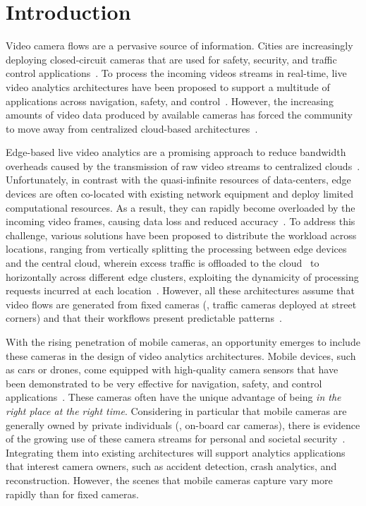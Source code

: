 \section{Introduction}\label{sec:intro}

Video camera flows are a pervasive source of information. Cities are increasingly deploying closed-circuit cameras that are used for safety,
security, and traffic control applications~\cite{parascandola_2018,ratcliffe_2020,grassi2017parkmaster}. To process the incoming videos streams in real-time, live video analytics architectures have been proposed to support a multitude of applications across navigation, safety, and control~\cite{ananthanarayanan2017real,ao2018sprocket,zeng2020distream,jiang2018chameleon,zhang2017live}. However, the increasing amounts of video data produced by available cameras has forced the community to move away from centralized cloud-based architectures~\cite{yi2017lavea,ananthanarayanan2017real}.

Edge-based live video analytics are a promising approach to reduce bandwidth overheads caused by the transmission of raw video streams to centralized clouds~\cite{hu2023edge}. Unfortunately, in contrast with the quasi-infinite resources of data-centers, edge devices are often co-located with existing network equipment and deploy limited computational resources. As a result, they can rapidly become overloaded by the incoming video frames, causing data loss and reduced accuracy~\cite{jiang2018chameleon,jain2020spatula}. To address this challenge, various solutions have been proposed to distribute the workload across locations, ranging from vertically splitting the processing between edge devices and the central cloud, wherein excess traffic is offloaded to the cloud~\cite{hung2018videoedge,chen2015glimpse} to horizontally across different edge clusters, exploiting the dynamicity of processing requests incurred at each location~\cite{jain2020spatula,zhang2019hetero}. However, all these architectures assume that video flows are generated from fixed cameras (\eg, traffic cameras deployed at street corners) and that their workflows present predictable patterns~\cite{jiang2018chameleon}.

With the rising penetration of mobile cameras, an opportunity emerges to include these cameras in the design of video analytics architectures. Mobile devices, such as cars or drones, come equipped with high-quality camera sensors that have been demonstrated to be very effective for navigation, safety, and control applications~\cite{wang2018bandwidth,grassi2017parkmaster}. These cameras often have the unique advantage of being {\em in the right place at the right time}. Considering in particular that mobile cameras are generally owned by private individuals (\eg, on-board car cameras), there is evidence of the growing use of these camera streams for personal and societal security~\cite{rea2018dash,giovannini2021importance}. Integrating them into existing architectures will support analytics applications that interest camera owners, such as accident detection, crash analytics, and reconstruction. However, the scenes that mobile cameras capture vary more rapidly than for fixed cameras.

